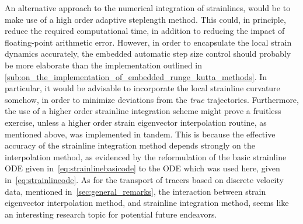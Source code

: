 An alternative approach to the numerical integration of strainlines, would be
to make use of a high order adaptive steplength method. This could, in
principle, reduce the required computational time, in addition to reducing
the impact of floating-point arithmetic error. However, in order to encapsulate
the local strain dynamics accurately, the embedded automatic step size control
should probably be more elaborate than the implementation outlined in
\cref{sub:on_the_implementation_of_embedded_runge_kutta_methods}. In particular,
it would be advisable to incorporate the local strainline curvature somehow,
in order to minimize deviations from the \emph{true} trajectories. Furthermore,
the use of a higher order strainline integration scheme might prove a fruitless
exercise, unless a higher order strain eigenvector interpolation routine, as
mentioned above, was implemented in tandem. This is because the effective
accuracy of the strainline integration method depends strongly on the
interpolation method, as evidenced by the reformulation of the basic
strainline ODE given in~\cref{eq:strainlinebasicode} to the ODE which
was used here, given in~\cref{eq:strainlineode}. As for the transport of tracers
based on discrete velocity data, mentioned in~\cref{sec:general_remarks}, the
interaction between strain eigenvector interpolation method, and strainline
integration method, seems like an interesting research topic for potential
future endeavors.

%
